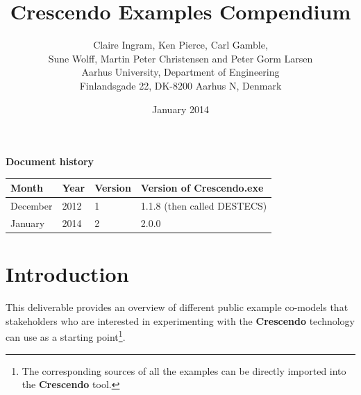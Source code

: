 \documentclass{crescendorepchap}
\newcommand{\DESTECS}{\textbf{Crescendo}\xspace}
\begin{document}
\title{Crescendo Examples Compendium}
\author{Claire Ingram, Ken Pierce, Carl Gamble, \\[5mm]
Sune Wolff, Martin Peter
Christensen and Peter Gorm Larsen\\
Aarhus University, Department of Engineering\\
Finlandsgade 22, DK-8200 Aarhus N, Denmark
}

\date{January 2014}


\maketitle

\frontmatter

\textbf{Document history}

\begin{tabular}{|l|l|l|l|}\hline
Month   & Year & Version & Version of Crescendo.exe \\ \hline
December& 2012 & 1       & 1.1.8 (then called DESTECS)  \\ \hline
January& 2014 & 2       & 2.0.0 \\ \hline
\end{tabular}

\cleardoublepage

%

\cleardoublepage


%

%


\tableofcontents


\mainmatter
\chapter{Introduction}\label{cha:intro}
This deliverable provides an overview of different public example
co-models that stakeholders who are interested in experimenting with
the \DESTECS technology can use as a starting point\footnote{The corresponding
sources of all the examples can be directly imported into the \DESTECS tool.}.
\end{document}
